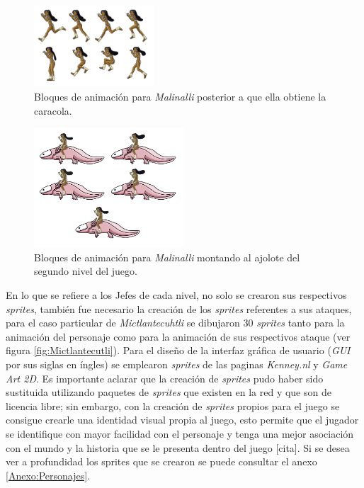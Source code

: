 \begin{figure}[h]
	\centering
	\includegraphics[width=0.4\textwidth]{03TrabajoRealizado/imagenes/MalinalliArma.png}
 	\caption{Bloques de animación para \textit{Malinalli} posterior a que ella obtiene la caracola.}
	\label{fig:MalinalliCaracola}		
\end{figure}

\begin{figure}[h]
	\centering
	\includegraphics[width=0.5\textwidth]{03TrabajoRealizado/imagenes/MalinaliAjolote.png}
 	\caption{Bloques de animación para \textit{Malinalli} montando al ajolote del segundo nivel del juego.}
	\label{fig:MalinalliAjolote}		
\end{figure}

En lo que se refiere a los Jefes de cada nivel, no solo se crearon sus 
respectivos \textit{sprites}, también fue necesario la creación de los 
\textit{sprites} referentes a sus ataques, para el caso particular de 
\textit{Mictlantecuhtli} se dibujaron 30 \textit{sprites} tanto para la animación 
del personaje como para la animación de sus respectivos ataque (ver figura 
\ref{fig:Mictlantecutli}). Para el diseño de la interfaz gráfica de usuario
(\textit{GUI} por sus siglas en íngles) se emplearon \textit{sprites} de las 
paginas \textit{Kenney.nl} y \textit{Game Art 2D}. Es importante aclarar que la 
creación de \textit{sprites} pudo haber sido sustituida utilizando paquetes de 
\textit{sprites} que existen en la red y que son de licencia libre; sin embargo, 
con la creación de \textit{sprites} propios para el juego se consigue crearle una 
identidad visual propia al juego, esto permite que el jugador se identifique con 
mayor facilidad con el personaje y tenga una mejor asociación con el mundo y la 
historia que se le presenta dentro del juego [cita]. Si se desea ver a profundidad 
los {sprites} que se crearon se puede consultar el anexo \ref{Anexo:Personajes}. 


